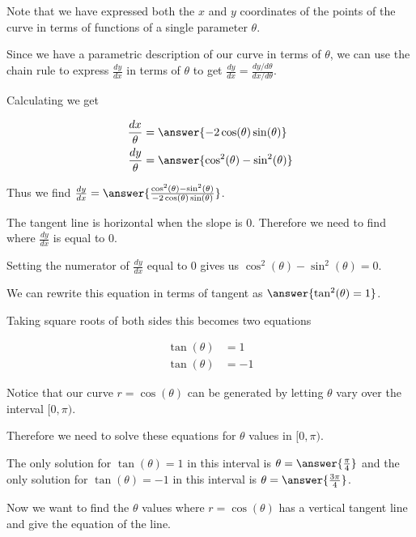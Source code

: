 \documentclass{ximera}
\begin{document}
\begin{exercise}
\begin{hint}
Note that we have expressed both the $x$ and $y$ coordinates of the points of the curve in terms of functions of a single parameter $\theta$.

Since we have a parametric description of our curve in terms of $\theta$, 
we can use the chain rule to express $\frac{dy}{dx}$ in terms of $\theta$ to get $\frac{dy}{dx}=\frac{ dy/d\theta}{dx/d\theta}$.

Calculating we get

\begin{align*}
\frac{dx}{\theta}&=\answer{ -2\cos(\theta)\sin(\theta)  } \\
\frac{dy}{\theta}&=\answer{ \cos^2(\theta)-\sin^2(\theta)    }
\end{align*} 

Thus we find $\frac{dy}{dx}=\answer{ \frac{ \cos^2(\theta)-\sin^2(\theta)}{-2\cos(\theta)\sin(\theta)}}$. 

The tangent line is horizontal when the slope is $0$. Therefore we need to find where $\frac{dy}{dx}$ is equal to $0$.

Setting the numerator of $\frac{dy}{dx}$ equal to $0$ gives us $\cos^2(\theta)-\sin^2(\theta)=0$. 

We can rewrite this equation in terms of tangent as $\answer{ \tan^2(\theta)=1 }$. 

Taking square roots of both sides this becomes two equations

\begin{align*}
 \tan(\theta)&=1 \\
\tan(\theta)&=-1
\end{align*}

Notice that our curve $r=\cos(\theta)$ can be generated by letting $\theta$ vary over the interval $[0, \pi)$. 

Therefore we need to solve these equations for $\theta$ values in  $[0, \pi)$. 

The only solution for $\tan(\theta)=1$ in this interval is $\theta=\answer{\frac{\pi}{4}}$ and the only solution 
for $\tan(\theta)=-1$ in this interval is $\theta=\answer{\frac{3\pi}{4}}$. 



\end{hint}

\begin{exercise}



Now we want to find the $\theta$ values where $r=\cos(\theta)$ has a vertical tangent line and give the equation of the line. 


\end{exercise}
\end{exercise}
\end{document}
